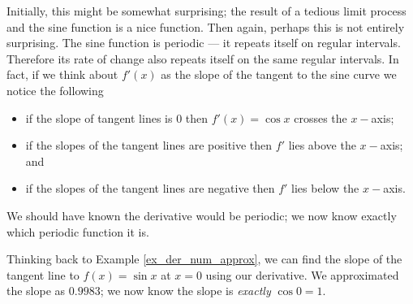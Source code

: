 Initially, this might be somewhat surprising; the result of a tedious limit process and the sine function is a nice function. Then again, perhaps this is not entirely surprising. The sine function is periodic --- it repeats itself on regular intervals. Therefore its rate of change also repeats itself on the same regular intervals. In fact, if we think about $f'(x)$ as the slope of the tangent to the sine curve we notice the following
\begin{itemize}
\item if the slope of tangent lines is 0 then $f'(x)=\cos x$ crosses the $x-$axis;
\item if the slopes of the tangent lines are positive then $f'$ lies above the $x-$axis; and 
\item if the slopes of the tangent lines are negative then $f'$ lies below the $x-$axis.
\end{itemize}

We should have known the derivative would be periodic; we now know exactly which periodic function it is.

Thinking back to Example \ref{ex_der_num_approx}, we can find the slope of the tangent line to $f(x)=\sin x$ at $x=0$ using our derivative. We approximated the slope as $0.9983$; we now know the slope is \textit{exactly} $\cos 0 =1$.

